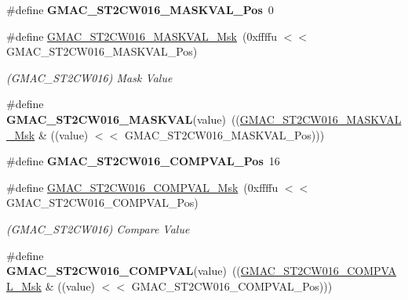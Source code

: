 \begin{DoxyCompactItemize}
\#define {\bfseries G\+M\+A\+C\+\_\+\+S\+T2\+C\+W016\+\_\+\+M\+A\+S\+K\+V\+A\+L\+\_\+\+Pos}~0
\item 
\mbox{\label{group__SAME70__GMAC_gaff3b6dcc87b79b538e7e4a9d587e3ebf}} 
\#define \mbox{\hyperlink{group__SAME70__GMAC_gaff3b6dcc87b79b538e7e4a9d587e3ebf}{G\+M\+A\+C\+\_\+\+S\+T2\+C\+W016\+\_\+\+M\+A\+S\+K\+V\+A\+L\+\_\+\+Msk}}~(0xffffu $<$$<$ G\+M\+A\+C\+\_\+\+S\+T2\+C\+W016\+\_\+\+M\+A\+S\+K\+V\+A\+L\+\_\+\+Pos)
\begin{DoxyCompactList}\small\item\em (G\+M\+A\+C\+\_\+\+S\+T2\+C\+W016) Mask Value \end{DoxyCompactList}\item 
\mbox{\label{group__SAME70__GMAC_gac4c01111b879a89d2427383ecc97029d}} 
\#define {\bfseries G\+M\+A\+C\+\_\+\+S\+T2\+C\+W016\+\_\+\+M\+A\+S\+K\+V\+AL}(value)~((\mbox{\hyperlink{group__SAMV71__GMAC_gaff3b6dcc87b79b538e7e4a9d587e3ebf}{G\+M\+A\+C\+\_\+\+S\+T2\+C\+W016\+\_\+\+M\+A\+S\+K\+V\+A\+L\+\_\+\+Msk}} \& ((value) $<$$<$ G\+M\+A\+C\+\_\+\+S\+T2\+C\+W016\+\_\+\+M\+A\+S\+K\+V\+A\+L\+\_\+\+Pos)))
\item 
\mbox{\label{group__SAME70__GMAC_gaef1c5689897bbdcbd57b182c8d68c15e}} 
\#define {\bfseries G\+M\+A\+C\+\_\+\+S\+T2\+C\+W016\+\_\+\+C\+O\+M\+P\+V\+A\+L\+\_\+\+Pos}~16
\item 
\mbox{\label{group__SAME70__GMAC_ga602eb37a57261f7768628f7eca2a1f5d}} 
\#define \mbox{\hyperlink{group__SAME70__GMAC_ga602eb37a57261f7768628f7eca2a1f5d}{G\+M\+A\+C\+\_\+\+S\+T2\+C\+W016\+\_\+\+C\+O\+M\+P\+V\+A\+L\+\_\+\+Msk}}~(0xffffu $<$$<$ G\+M\+A\+C\+\_\+\+S\+T2\+C\+W016\+\_\+\+C\+O\+M\+P\+V\+A\+L\+\_\+\+Pos)
\begin{DoxyCompactList}\small\item\em (G\+M\+A\+C\+\_\+\+S\+T2\+C\+W016) Compare Value \end{DoxyCompactList}\item 
\mbox{\label{group__SAME70__GMAC_gae4604be622d3a9c17c6abdc30772b3be}} 
\#define {\bfseries G\+M\+A\+C\+\_\+\+S\+T2\+C\+W016\+\_\+\+C\+O\+M\+P\+V\+AL}(value)~((\mbox{\hyperlink{group__SAMV71__GMAC_ga602eb37a57261f7768628f7eca2a1f5d}{G\+M\+A\+C\+\_\+\+S\+T2\+C\+W016\+\_\+\+C\+O\+M\+P\+V\+A\+L\+\_\+\+Msk}} \& ((value) $<$$<$ G\+M\+A\+C\+\_\+\+S\+T2\+C\+W016\+\_\+\+C\+O\+M\+P\+V\+A\+L\+\_\+\+Pos)))

\end{DoxyCompactItemize}
